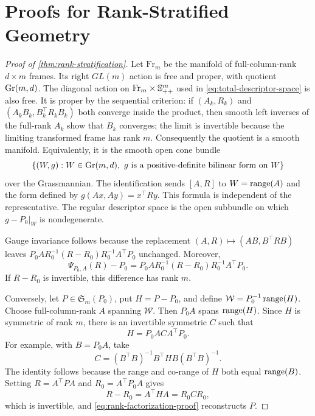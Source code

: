 \section{Proofs for Rank-Stratified Geometry}
\label{app:stratified-proofs}

\begin{proof}[Proof of \cref{thm:rank-stratification}]
Let \(\mathrm{Fr}_m\) be the manifold of full-column-rank \(d\times m\)
frames.  Its right \(GL(m)\) action is free and proper, with quotient
\(\mathrm{Gr}(m,d)\).  The diagonal action on
\(\mathrm{Fr}_m\times\mathbb S_{++}^m\) used in
\eqref{eq:total-descriptor-space} is also free.  It is proper by the
sequential criterion: if \((A_k,R_k)\) and
\((A_kB_k,B_k^\top R_kB_k)\) both converge inside the product, then smooth
left inverses of the full-rank \(A_k\) show that \(B_k\) converges; the limit
is invertible because the limiting transformed frame has rank \(m\).
Consequently the quotient is a smooth manifold.  Equivalently, it is the
smooth open cone bundle
\[
  \{(W,g):W\in\mathrm{Gr}(m,d),\ g\text{ is a positive-definite bilinear form on }W\}
\]
over the Grassmannian.  The identification sends \([A,R]\) to
\(W=\operatorname{range}(A)\) and the form defined by
\(g(Ax,Ay)=x^\top Ry\).  This formula is independent of the representative.
The regular descriptor space is the open subbundle on which
\(g-P_0|_W\) is nondegenerate.

Gauge invariance follows because the replacement
\((A,R)\mapsto(AB,B^\top RB)\) leaves
\(P_0AR_0^{-1}(R-R_0)R_0^{-1}A^\top P_0\) unchanged.  Moreover,
\begin{equation}
  \Psi_{P_0,A}(R)-P_0
  =P_0AR_0^{-1}(R-R_0)R_0^{-1}A^\top P_0.
  \label{eq:rank-factorization-proof}
\end{equation}
If \(R-R_0\) is invertible, this difference has rank \(m\).

Conversely, let \(P\in\mathfrak S_m(P_0)\), put \(H=P-P_0\), and define
\(\mathcal W=P_0^{-1}\operatorname{range}(H)\).  Choose full-column-rank \(A\) spanning
\(\mathcal W\).  Then \(P_0A\) spans \(\operatorname{range}(H)\).  Since \(H\) is
symmetric of rank \(m\), there is an invertible symmetric \(C\) such that
\[
  H=P_0ACA^\top P_0.
\]
For example, with \(B=P_0A\), take
\[
  C=(B^\top B)^{-1}B^\top H B(B^\top B)^{-1}.
\]
The identity follows because the range and co-range of \(H\) both equal
\(\operatorname{range}(B)\).  Setting \(R=A^\top PA\) and \(R_0=A^\top P_0A\) gives
\[
  R-R_0=A^\top H A=R_0CR_0,
\]
which is invertible, and \eqref{eq:rank-factorization-proof} reconstructs
\(P\).


\end{proof}
